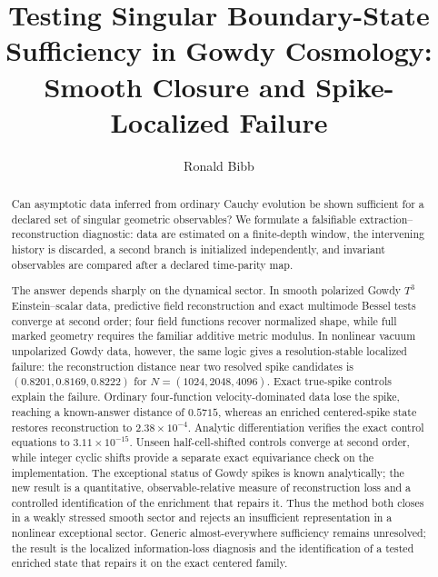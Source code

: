 \documentclass{iopjournal}
\begin{document}

\title{Testing Singular Boundary-State Sufficiency in Gowdy Cosmology: Smooth Closure and Spike-Localized Failure}

\author{Ronald Bibb}
\par\noindent{}\par

\begin{abstract}
Can asymptotic data inferred from ordinary Cauchy evolution be shown sufficient for a declared set of singular geometric observables? We formulate a falsifiable extraction--reconstruction diagnostic: data are estimated on a finite-depth window, the intervening history is discarded, a second branch is initialized independently, and invariant observables are compared after a declared time-parity map.

The answer depends sharply on the dynamical sector. In smooth polarized Gowdy $T^3$ Einstein--scalar data, predictive field reconstruction and exact multimode Bessel tests converge at second order; four field functions recover normalized shape, while full marked geometry requires the familiar additive metric modulus. In nonlinear vacuum unpolarized Gowdy data, however, the same logic gives a resolution-stable localized failure: the reconstruction distance near two resolved spike candidates is $(0.8201,0.8169,0.8222)$ for $N=(1024,2048,4096)$. Exact true-spike controls explain the failure. Ordinary four-function velocity-dominated data lose the spike, reaching a known-answer distance of $0.5715$, whereas an enriched centered-spike state restores reconstruction to $2.38\times10^{-4}$. Analytic differentiation verifies the exact control equations to $3.11\times10^{-15}$. Unseen half-cell-shifted controls converge at second order, while integer cyclic shifts provide a separate exact equivariance check on the implementation. The exceptional status of Gowdy spikes is known analytically; the new result is a quantitative, observable-relative measure of reconstruction loss and a controlled identification of the enrichment that repairs it. Thus the method both closes in a weakly stressed smooth sector and rejects an insufficient representation in a nonlinear exceptional sector. Generic almost-everywhere sufficiency remains unresolved; the result is the localized information-loss diagnosis and the identification of a tested enriched state that repairs it on the exact centered family.
\end{abstract}
\end{document}
